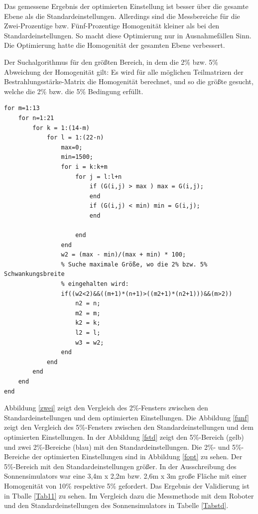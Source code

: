 \documentclass[a4paper,bibtotoc,oneside]{scrbook}
\begin{document}
\noindent Das gemessene Ergebnis der optimierten Einstellung ist besser über die gesamte Ebene als die Standardeinstellungen.
Allerdings sind die Messbereiche für die Zwei-Prozentige bzw. Fünf-Prozentige Homogenität kleiner als bei den Standardeinstellungen. So macht diese Optimierung nur in Ausnahmefällen Sinn. Die Optimierung hatte die Homogenität der gesamten Ebene verbessert.

\noindent Der Suchalgorithmus für den größten Bereich, in dem die 2\% bzw. 5\% Abweichung der Homogenität gilt: Es wird für alle möglichen Teilmatrizen der Bestrahlungsstärke-Matrix die Homogenität berechnet, und so die größte gesucht, welche die 2\% bzw. die 5\% Bedingung erfüllt.
\begin{verbatim}
for m=1:13
    for n=1:21
        for k = 1:(14-m)
            for l = 1:(22-n)
                max=0;
                min=1500;
                for i = k:k+m
                    for j = l:l+n
                        if (G(i,j) > max ) max = G(i,j);
                        end
                        if (G(i,j) < min) min = G(i,j);
                        end
                        
                    end
                end
                w2 = (max - min)/(max + min) * 100;
                % Suche maximale Größe, wo die 2% bzw. 5% Schwankungsbreite
                % eingehalten wird:
                if((w2<2)&&((m+1)*(n+1)>((m2+1)*(n2+1)))&&(m>2))
                    n2 = n;
                    m2 = m;
                    k2 = k;
                    l2 = l;
                    w3 = w2;
                end
            end
        end
    end
end
\end{verbatim}

\noindent Abbildung \ref{zwei} zeigt den Vergleich des 2\%-Fensters zwischen den Standardeinstellungen und dem optimierten Einstellungen.
Die Abbildung \ref{funf} zeigt den Vergleich des 5\%-Fensters zwischen den Standardeinstellungen und dem optimierten Einstellungen.
In der Abbildung \ref{fstd} zeigt den 5\%-Bereich (gelb) und zwei 2\%-Bereiche (blau) mit den Standardeinstellungen.
Die 2\%- und 5\%-Bereiche der optimierten Einstellungen sind in Abbildung \ref{fopt} zu sehen. Der 5\%-Bereich mit den Standardeinstellungen größer.
In der Ausschreibung des Sonnensimulators war eine 3,4m x 2,2m bzw. 2,6m x 3m große Fläche mit einer Homogenität von 10\% respektive 5\% gefordert. 
Das Ergebnis der Validierung ist in Tballe \ref{Tab11} zu sehen. Im Vergleich dazu die Messmethode mit dem Roboter und den Standardeinstellungen des Sonnensimulators in Tabelle \ref{Tabstd}.
\end{document}
